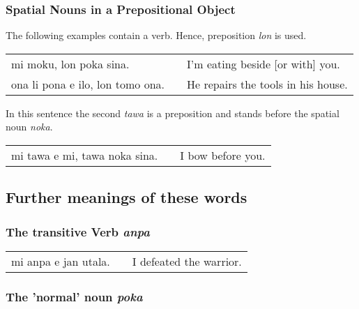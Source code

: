 %
\subsubsection*{Spatial Nouns in a Prepositional Object}
%
%

The following examples contain a verb.
Hence, preposition \textit{lon} is used.

\begin{supertabular}{p{5,5cm}|ll}
    mi moku, lon poka sina.          &  & I'm eating beside [or with] you.   \\
    ona li pona e ilo, lon tomo ona. &  & He repairs the tools in his house. \\
\end{supertabular}

In this sentence the second \textit{tawa} is a preposition and stands before the spatial noun \textit{noka}.

\begin{supertabular}{p{5,5cm}|ll}
    mi tawa e mi, tawa noka sina. &  & I bow before you. \\
\end{supertabular}

%
%
%
\subsection*{Further meanings of these words}
%
%
%
\subsubsection*{The transitive Verb \textit{anpa}}
%

\begin{supertabular}{p{5,5cm}|ll}
    mi anpa e jan utala. &  & I defeated the warrior. \\
\end{supertabular}

%
\subsubsection*{The 'normal' noun \textit{poka}}
%

